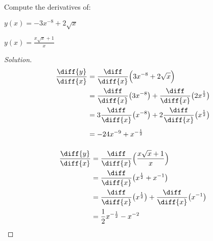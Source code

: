 \documentclass[crop=false,class=book,oneside]{standalone}
\begin{document}
            \begin{problem}
                Compute the derivatives of:
                \begin{enumerate}[label=(\alph*)]
                    \begin{multicols}{2}
                        \item $y(x)=-3x^{-8}+2\sqrt{x}$
                        \item $y(x)=\frac{x\sqrt{x}+1}{x}$
                    \end{multicols}
                \end{enumerate}
            \end{problem}
            \begin{proof}[Solution]
                \par\hfill\par
                \begin{minipage}[b]{.49\textwidth}
                    \centering
                    \begin{align*}
                        \frac{\diff{y}}{\diff{x}}
                        &=\frac{\diff}{\diff{x}}
                            \Big(3x^{-8}+2\sqrt{x}\Big)\\
                        &=\frac{\diff}{\diff{x}}
                            \big(3x^{-8}\big)
                        +\frac{\diff}{\diff{x}}
                            \big(2x^{\frac{1}{2}}\big)\\
                        &=3\frac{\diff}{\diff{x}}
                            \big(x^{-8}\big)+
                            2\frac{\diff}{\diff{x}}
                            \big(x^{\frac{1}{2}}\big)\\
                        &=-24x^{-9}+x^{-\frac{1}{2}}
                        \vphantom{\frac{\diff}{\diff}}
                    \end{align*}
                \end{minipage}
                \hfill
                \vline
                \begin{minipage}[b]{.49\textwidth}
                    \centering
                    \begin{align*}
                        \frac{\diff{y}}{\diff{x}}
                        &=\frac{\diff}{\diff{x}}
                            \Big(\frac{x\sqrt{x}+1}{x}\Big)\\
                        &=\frac{\diff}{\diff{x}}
                            \big(x^{\frac{1}{2}}+x^{-1}\big)\\
                        &=\frac{\diff}{\diff{x}}
                            \big(x^{\frac{1}{2}}\big)
                            +\frac{\diff}{\diff{x}}
                            \big(x^{-1}\big)\\
                        &=\frac{1}{2}x^{-\frac{1}{2}}-x^{-2}
                            \vphantom{\frac{\diff}{\diff}}
                    \end{align*}
                \end{minipage}
            \end{proof}
\end{document}
